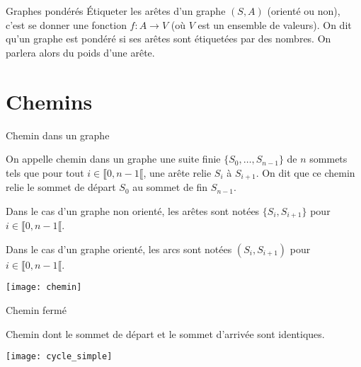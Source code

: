 \begin{defi}{Graphes pondérés}
Étiqueter les arêtes d’un graphe $(S, A)$ (orienté ou non), c’est se donner une fonction
$f : A \to V$ (où $V$ est un ensemble de valeurs). On dit qu’un graphe est pondéré si ses arêtes sont étiquetées par des nombres. On parlera alors du poids d’une arête.
\end{defi}
%
%

\section{Chemins}

\begin{defi}{Chemin dans un graphe} \\

\noindent\begin{minipage}{.7\linewidth}
On appelle chemin dans un graphe une suite finie $\{S_0, \ldots , S_{n-1}\}$ de $n$ sommets tels que pour tout
$i \in \llbracket 0, n-1\llbracket$, une arête relie $S_i$ à $S_{i+1}$. On dit que ce chemin relie le sommet de départ $S_0$ au sommet de fin $S_{n-1}$. 

Dans le cas d'un graphe non orienté, les arêtes sont notées $\{S_i, S_{i+1}\}$ pour $i \in \llbracket 0, n-1\llbracket$.

Dans le cas d'un graphe orienté, les arcs sont notées $(S_i, S_{i+1})$ pour $i \in \llbracket 0, n-1\llbracket$.
\end{minipage}\hfill
\begin{minipage}{.25\linewidth}
\texttt{[image: chemin]}
\end{minipage}
\end{defi}

\begin{defi}{Chemin fermé} \\

\noindent\begin{minipage}{.7\linewidth}
Chemin dont le sommet de départ et le sommet d'arrivée sont identiques.
\end{minipage}\hfill
\begin{minipage}{.25\linewidth}
\texttt{[image: cycle\_simple]}
\end{minipage}

\end{defi}

